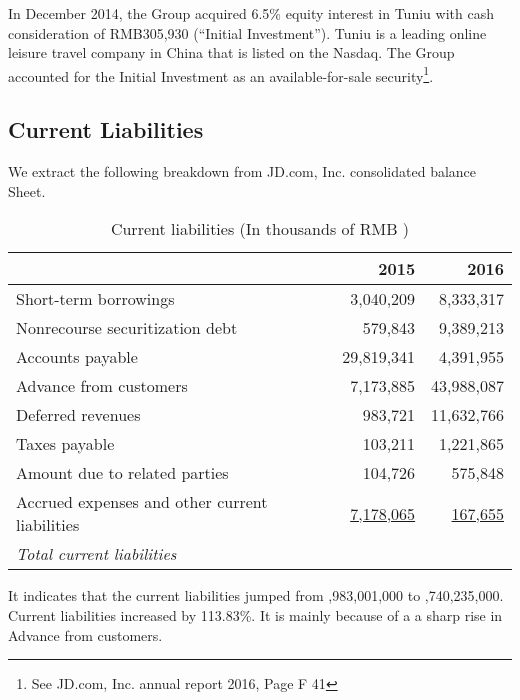 In December 2014, the Group acquired 6.5\% equity interest in Tuniu with cash consideration of RMB305,930 (“Initial Investment”). Tuniu is a leading
online leisure travel company in China that is listed on the Nasdaq. The Group accounted for the Initial Investment as an available-for-sale security\footnote{See JD.com, Inc. annual report 2016, Page F 41}.

\subsection{Current Liabilities}

We extract the following breakdown from JD.com, Inc. consolidated balance Sheet.\\
 
\begin{table}[H]	
	\begin{center}
		\begin{tabular}{lrr}
			\toprule
			&\textbf{2015}&\textbf{2016}\\
			\midrule
			Short-term borrowings&3,040,209&8,333,317\\
			Nonrecourse securitization debt&579,843&9,389,213\\
			Accounts payable&29,819,341&4,391,955\\
			Advance from customers&7,173,885&43,988,087\\
			Deferred revenues&983,721&11,632,766\\
			Taxes payable&103,211&1,221,865\\
			Amount due to related parties&104,726&575,848\\
			Accrued expenses and other current liabilities&\underline{7,178,065}&\underline{167,655}\\
			\qquad\emph{Total current liabilities}&\uuline{48,983,001}&\uuline{104,740,235}\\
			\bottomrule
		\end{tabular}
	\end{center}
	\caption{Current liabilities (In thousands of RMB \textyen)}\label{table:1}
\end{table}

It indicates that the current liabilities jumped from ,983,001,000 to ,740,235,000. Current liabilities increased by 113.83\%. It is mainly because of a a sharp rise in Advance from customers.
	
